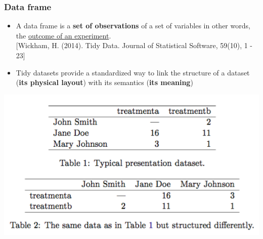 \documentclass{beamer}
\begin{document}
\begin{frame}[fragile]
	\frametitle{Data frame}
	\begin{itemize}
		\small
		\item A data frame is a \textbf{set of observations} of a set of variables  in other words, the \underline{outcome of an experiment}.\\ 
			\tiny [Wickham, H. (2014). Tidy Data. Journal of Statistical Software, 59(10), 1 - 23] 
\pause
	\small
	\item Tidy datasets provide a standardized way to link the structure of a dataset (\textbf{its physical layout}) with its semantics (\textbf{its meaning})	
	\end{itemize}
	\begin{center} \includegraphics[scale=0.25]{figures/hw_tidy1.png} \end{center}
 
\end{frame}
\end{document}
